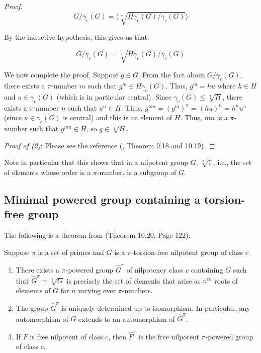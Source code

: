 \documentclass{ucetd}
\begin{document}
\begin{proof}
  $$G/\gamma_c(G) = \langle \sqrt[\pi]{H\gamma_c(G)/\gamma_c(G)} \rangle$$

  By the inductive hypothesis, this gives us that:

  $$G/\gamma_c(G) = \sqrt[\pi]{H\gamma_c(G)/\gamma_c(G)}$$

  We now complete the proof. Suppose $g \in G$. From the fact about
  $G/\gamma_c(G)$, there exists a $\pi$-number $m$ such that $g^m \in
  H\gamma_c(G)$. Thus, $g^m = hu$ where $h \in H$ and $u \in
  \gamma_c(G)$ (which is in particular central). Since $\gamma_c(G)
  \le \sqrt[\pi]{H}$, there exists a $\pi$-number $n$ such that $u^n
  \in H$. Thus, $g^{mn} = (g^m)^n = (hu)^n = h^nu^n$ (since $u \in \gamma_c(G)$ is
  central) and this is an element of $H$. Thus, $mn$ is a $\pi$-number
  such that $g^{mn} \in H$, so $g \in \sqrt[\pi]{H}$.

  {\em Proof of (2)}: Please see the reference (\cite{Khukhro},
  Theorem 9.18 and 10.19). %
\end{proof}

Note in particular that this shows that in a nilpotent group $G$,
$\sqrt[\pi]{1}$, i.e., the set of elements whose order is a
$\pi$-number, is a subgroup of $G$.

\subsection{Minimal powered group containing a torsion-free group}\label{sec:minimal-powered}

The following is a theorem from \cite{Khukhro} (Theorem 10.20, Page
122). %

\begin{theorem}\label{thm:pi-powered-envelope}
  Suppose $\pi$ is a set of primes and $G$ is a $\pi$-torsion-free
  nilpotent group of class $c$.

  \begin{enumerate}
  \item There exists a $\pi$-powered group $\hat{G}^\pi$ of nilpotency
    class $c$ containing $G$ such that $\hat{G}^\pi = \sqrt[\pi]{G}$ is
    precisely the set of elements that arise as $n^{th}$ roots of
    elements of $G$ for $n$ varying over $\pi$-numbers.
  \item The group $\hat{G}^\pi$ is uniquely determined up to
    isomorphism. In particular, any automorphism of $G$ extends to an
    automorphism of $\hat{G}^\pi$.
  \item If $F$ is free nilpotent of class $c$, then $\hat{F}^\pi$ is
    the free nilpotent $\pi$-powered group of class $c$.
  \end{enumerate}
\end{theorem}
\end{document}
